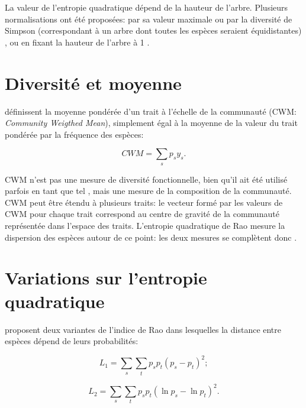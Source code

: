 \documentclass[
  11pt,
  french,
  a4paper,
  extrafontsizes,onecolumn,openright
  ]{memoir}
\newlength{\rf}
\begin{document}
La valeur de l'entropie quadratique dépend de la hauteur de l'arbre.
Plusieurs normalisations ont été proposées: par sa valeur maximale ou par la diversité de Simpson (correspondant à un arbre dont toutes les espèces seraient équidistantes) \autocite{Ricotta2005c}, ou en fixant la hauteur de l'arbre à 1 \autocite{Marcon2014b}.

\section{Diversité et moyenne}\label{diversituxe9-et-moyenne}

\textcite{Garnier2004} définissent la moyenne pondérée d'un trait à l'échelle de la communauté (CWM: \emph{Community Weigthed Mean}), simplement égal à la moyenne de la valeur du trait pondérée par la fréquence des espèces:

\begin{equation}
  \label{eq:CWM}
  \mathit{CWM} = \sum_s{p_s y_s}.
\end{equation}

CWM n'est pas une mesure de diversité fonctionnelle, bien qu'il ait été utilisé parfois en tant que tel \autocite{Lavorel2008}, mais une mesure de la composition de la communauté.
CWM peut être étendu à plusieurs traits: le vecteur formé par les valeurs de CWM pour chaque trait correspond au centre de gravité de la communauté représentée dans l'espace des traits.
L'entropie quadratique de Rao mesure la dispersion des espèces autour de ce point: les deux mesures se complètent donc \autocite{Ricotta2011}.

\section{Variations sur l'entropie quadratique}\label{variations-sur-lentropie-quadratique}

\textcite{Izsak2011} proposent deux variantes de l'indice de Rao dans lesquelles la distance entre espèces dépend de leurs probabilités:

\begin{equation}
  \label{eq:L1}
  L_1 = \sum_{s}{\sum_{t}{p_{s}p_{t}{\left(p_{s}-p_{t}\right)}^2}};
\end{equation}

\begin{equation}
  \label{eq:L2}
  L_2=\sum_{s}{\sum_{t}{p_{s}p_{t}{\left(\ln{p_{s}}-\ln{p_{t}}\right)}^2}}.
\end{equation}
\end{document}
